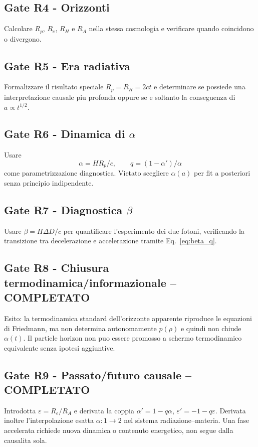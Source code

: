 \documentclass[11pt,a4paper]{article}
\begin{document}
\subsection*{Gate R4 - Orizzonti}
Calcolare $R_p$, $R_e$, $R_H$ e $R_A$ nella stessa cosmologia e verificare quando coincidono o divergono.

\subsection*{Gate R5 - Era radiativa}
Formalizzare il risultato speciale $R_p=R_H=2ct$ e determinare se possiede una interpretazione causale piu profonda oppure se e soltanto la conseguenza di $a\propto t^{1/2}$.

\subsection*{Gate R6 - Dinamica di $\alpha$}
Usare
\begin{equation}
 \alpha=HR_p/c,\qquad q=(1-\alpha')/\alpha
\end{equation}
come parametrizzazione diagnostica. Vietato scegliere $\alpha(a)$ per fit a posteriori senza principio indipendente.

\subsection*{Gate R7 - Diagnostica $\beta$}
Usare $\beta=H\Delta D/c$ per quantificare l'esperimento dei due fotoni, verificando la transizione tra decelerazione e accelerazione tramite Eq.~\eqref{eq:beta_q}.

\subsection*{Gate R8 - Chiusura termodinamica/informazionale -- COMPLETATO}
Esito: la termodinamica standard dell'orizzonte apparente riproduce le equazioni di Friedmann, ma non determina autonomamente $p(\rho)$ e quindi non chiude $\alpha(t)$. Il particle horizon non puo essere promosso a schermo termodinamico equivalente senza ipotesi aggiuntive.

\subsection*{Gate R9 - Passato/futuro causale -- COMPLETATO}
Introdotta $\varepsilon=R_e/R_A$ e derivata la coppia $\alpha'=1-q\alpha$, $\varepsilon'=-1-q\varepsilon$. Derivata inoltre l'interpolazione esatta $\alpha:1\to2$ nel sistema radiazione--materia. Una fase accelerata richiede nuova dinamica o contenuto energetico, non segue dalla causalita sola.
\end{document}

